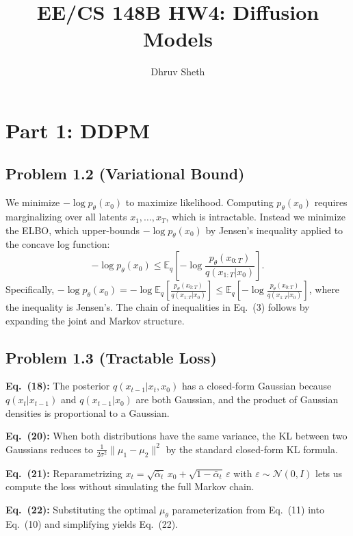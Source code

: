 \documentclass[11pt]{article}
\title{EE/CS 148B HW4: Diffusion Models}
\author{Dhruv Sheth}
\date{}
\begin{document}
\maketitle

\section*{Part 1: DDPM}

\subsection*{Problem 1.2 (Variational Bound)}

We minimize $-\log p_\theta(x_0)$ to maximize likelihood. Computing $p_\theta(x_0)$ requires marginalizing over all latents $x_1, \ldots, x_T$, which is intractable. Instead we minimize the ELBO, which upper-bounds $-\log p_\theta(x_0)$ by Jensen's inequality applied to the concave log function:
\[
-\log p_\theta(x_0) \leq \mathbb{E}_q\left[-\log \frac{p_\theta(x_{0:T})}{q(x_{1:T}|x_0)}\right].
\]
Specifically, $-\log p_\theta(x_0) = -\log \mathbb{E}_q\left[\frac{p_\theta(x_{0:T})}{q(x_{1:T}|x_0)}\right] \leq \mathbb{E}_q\left[-\log \frac{p_\theta(x_{0:T})}{q(x_{1:T}|x_0)}\right]$, where the inequality is Jensen's. The chain of inequalities in Eq.~(3) follows by expanding the joint and Markov structure.

\subsection*{Problem 1.3 (Tractable Loss)}

\textbf{Eq.~(18):} The posterior $q(x_{t-1}|x_t, x_0)$ has a closed-form Gaussian because $q(x_t|x_{t-1})$ and $q(x_{t-1}|x_0)$ are both Gaussian, and the product of Gaussian densities is proportional to a Gaussian.

\textbf{Eq.~(20):} When both distributions have the same variance, the KL between two Gaussians reduces to $\frac{1}{2\sigma^2}\|\mu_1 - \mu_2\|^2$ by the standard closed-form KL formula.

\textbf{Eq.~(21):} Reparametrizing $x_t = \sqrt{\bar\alpha_t}\, x_0 + \sqrt{1-\bar\alpha_t}\,\varepsilon$ with $\varepsilon \sim \mathcal{N}(0, I)$ lets us compute the loss without simulating the full Markov chain.

\textbf{Eq.~(22):} Substituting the optimal $\mu_\theta$ parameterization from Eq.~(11) into Eq.~(10) and simplifying yields Eq.~(22).
\end{document}

